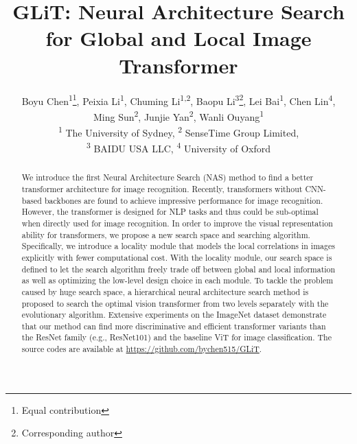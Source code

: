 \documentclass[10pt,twocolumn,letterpaper]{article}
\begin{document}
\title{GLiT: Neural Architecture Search for Global and Local Image Transformer}


\author{Boyu Chen\textsuperscript{1}\thanks{Equal contribution}, Peixia Li\textsuperscript{1}\footnotemark[1],  Chuming Li\textsuperscript{1,2}, 
Baopu Li\textsuperscript{3}\thanks{Corresponding author}, Lei Bai\textsuperscript{1}, Chen Lin\textsuperscript{4}, \\ Ming Sun\textsuperscript{2}, Junjie Yan\textsuperscript{2}, Wanli Ouyang\textsuperscript{1}\footnotemark[2] \\
\textsuperscript{1} The University of Sydney,
\textsuperscript{2} SenseTime Group Limited,  \\
\textsuperscript{3} BAIDU USA LLC, 
\textsuperscript{4} University of Oxford  \\
}




\maketitle
\ificcvfinal\thispagestyle{empty}\fi

\begin{abstract}
We introduce the first Neural Architecture Search (NAS) method to find a better transformer architecture for image recognition. Recently, transformers without CNN-based backbones are found to achieve impressive performance for image recognition. However, the transformer is designed for NLP tasks and thus could be sub-optimal when directly used for image recognition. In order to improve the visual representation ability for transformers, we propose a new search space and searching algorithm. Specifically, we introduce a locality module that models the local correlations in images explicitly with fewer computational cost. 
With the locality module, our search space is defined to let the search algorithm freely trade off between global and local information as well as optimizing the low-level design choice in each module. To tackle the problem caused by huge search space, a hierarchical neural architecture search method is proposed to search the optimal vision transformer from two levels separately with the evolutionary algorithm.
Extensive experiments on the ImageNet dataset demonstrate that our method can find more discriminative and efficient transformer variants than the ResNet family (e.g., ResNet101) and the baseline ViT for image classification. The source codes are available at \href{https://github.com/bychen515/GLiT}{https://github.com/bychen515/GLiT}.
\end{abstract}
\end{document}
